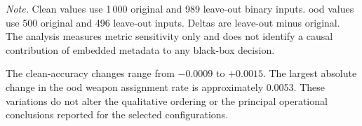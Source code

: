 \begin{table}[H]
\centering
\scriptsize
\renewcommand{\arraystretch}{1.12}
\setlength{\tabcolsep}{3.2pt}
\caption{Leave-out sensitivity results for files containing predefined
embedded-metadata term matches}
\label{tab:results-embedded-metadata-leaveout}

\vspace{0.4em}
\footnotesize
\textit{Note.} Clean values use 1\,000 original and 989 leave-out binary
inputs. \acrshort{ood} values use 500 original and 496 leave-out inputs. Deltas
are leave-out minus original. The analysis measures metric sensitivity only and
does not identify a causal contribution of embedded metadata to any black-box
decision.
\end{table}

The clean-accuracy changes range from \(-0.0009\) to \(+0.0015\). The largest
absolute change in the \gls{ood} weapon assignment rate is approximately
0.0053. These variations do not alter the qualitative ordering or the principal
operational conclusions reported for the selected configurations.


